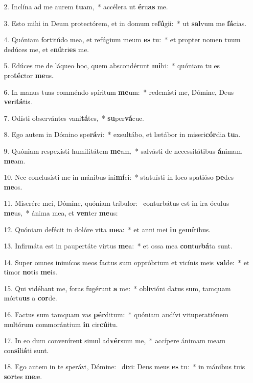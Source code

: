 2. Inclína ad me aurem \textbf{tu}am,~*  accélera ut \textbf{é}ru\textbf{as} me.\

3. Esto mihi in Deum protectórem, et in domum re\textbf{fú}gii:~*  ut \textbf{sal}vum me \textbf{fá}cias.\

4. Quóniam fortitúdo mea, et refúgium meum \textbf{es} tu:~*  et propter nomen tuum dedúces me, et e\textbf{nú}tri\textbf{es} me.\

5. Edúces me de láqueo hoc, quem abscondérunt \textbf{mi}hi:~*  quóniam tu es pro\textbf{téc}tor \textbf{me}us.\

6. In manus tuas comméndo spíritum \textbf{me}um:~*  redemísti me, Dómine, Deus \textbf{ve}ri\textbf{tá}tis.\

7. Odísti observántes vani\textbf{tá}tes,~*  \textbf{su}per\textbf{vá}cue.\

8. Ego autem in Dómino spe\textbf{rá}vi:~*  exsultábo, et lætábor in miseri\textbf{cór}dia \textbf{tu}a.\

9. Quóniam respexísti humilitátem \textbf{me}am,~*  salvásti de necessitátibus \textbf{á}nimam \textbf{me}am.\

10. Nec conclusísti me in mánibus ini\textbf{mí}ci:~*  statuísti in loco spatióso \textbf{pe}des \textbf{me}os.\

11. Miserére mei, Dómine, quóniam tríbulor: \dag\  conturbátus est in ira óculus \textbf{me}us,~*  ánima mea, et \textbf{ven}ter \textbf{me}us:\

12. Quóniam defécit in dolóre vita \textbf{me}a:~*  et anni mei \textbf{in} ge\textbf{mí}tibus.\

13. Infirmáta est in paupertáte virtus \textbf{me}a:~*  et ossa mea \textbf{con}tur\textbf{bá}ta sunt.\

14. Super omnes inimícos meos factus sum oppróbrium et vicínis meis \textbf{val}de:~*  et timor \textbf{no}tis \textbf{me}is.\

15. Qui vidébant me, foras fugérunt \textbf{a} me:~*  oblivióni datus sum, tamquam mórtu\textbf{us} a \textbf{cor}de.\

16. Factus sum tamquam vas \textbf{pér}ditum:~*  quóniam audívi vituperatiónem multórum commorántium \textbf{in} cir\textbf{cú}itu.\

17. In eo dum convenírent simul ad\textbf{vér}sum me,~*  accípere ánimam meam con\textbf{si}li\textbf{á}ti sunt.\

18. Ego autem in te sperávi, Dómine: \dag\  dixi: Deus meus \textbf{es} tu:~*  in mánibus tuis \textbf{sor}tes \textbf{me}æ.\

